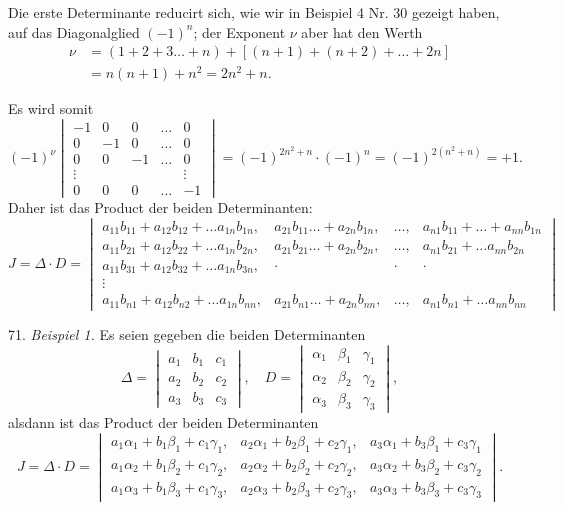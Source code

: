 \documentclass[11pt]{article}
\providecommand{\weberpage}[1]{}
\let\Delta\varDelta
\begin{document}
Die erste Determinante reducirt sich, wie wir in Beispiel 4 Nr. 30
gezeigt haben, auf das Diagonalglied $(-1)^n$; der Exponent $\nu$ aber
hat den Werth
\[
\begin{aligned}
\nu &= (1+2+3\dots+n)+[(n+1)+(n+2)+\dots+2n] \\
&= n(n+1)+n^2 = 2n^2+n.
\end{aligned}
\]


\weberpage{76}
Es wird somit
\[
(-1)^{\nu}
\begin{vmatrix}
-1 & 0 & 0 & \dots & 0 \\
0 & -1 & 0 & \dots & 0 \\
0 & 0 & -1 & \dots & 0 \\
\vdots & & & & \vdots \\
0 & 0 & 0 & \dots & -1
\end{vmatrix}
= (-1)^{2n^2+n} \cdot (-1)^n = (-1)^{2(n^2+n)} = +1.
\]
Daher ist das Product der beiden Determinanten:
\[
J = \Delta \cdot D =
\begin{vmatrix}
a_{11}b_{11}+a_{12}b_{12}+\dots a_{1n}b_{1n}, & a_{21}b_{11}\dots+a_{2n}b_{1n}, & \dots, & a_{n1}b_{11}+\dots+a_{nn}b_{1n} \\
a_{11}b_{21}+a_{12}b_{22}+\dots a_{1n}b_{2n}, & a_{21}b_{21}\dots+a_{2n}b_{2n}, & \dots, & a_{n1}b_{21}+\dots a_{nn}b_{2n} \\
a_{11}b_{31}+a_{12}b_{32}+\dots a_{1n}b_{3n}, & \cdot & \cdot & \cdot \\
\vdots & & & \\
a_{11}b_{n1}+a_{12}b_{n2}+\dots a_{1n}b_{nn}, & a_{21}b_{n1}\dots+a_{2n}b_{nn}, & \dots, & a_{n1}b_{n1}+\dots a_{nn}b_{nn}
\end{vmatrix}
\]

71. \textit{Beispiel 1.} Es seien gegeben die beiden Determinanten
\[
\Delta = \begin{vmatrix} a_1 & b_1 & c_1 \\ a_2 & b_2 & c_2 \\ a_3 & b_3 & c_3 \end{vmatrix}, \quad
D = \begin{vmatrix} \alpha_1 & \beta_1 & \gamma_1 \\ \alpha_2 & \beta_2 & \gamma_2 \\ \alpha_3 & \beta_3 & \gamma_3 \end{vmatrix},
\]
alsdann ist das Product der beiden Determinanten
\[
J = \Delta \cdot D =
\begin{vmatrix}
a_1\alpha_1+b_1\beta_1+c_1\gamma_1, & a_2\alpha_1+b_2\beta_1+c_2\gamma_1, & a_3\alpha_1+b_3\beta_1+c_3\gamma_1 \\
a_1\alpha_2+b_1\beta_2+c_1\gamma_2, & a_2\alpha_2+b_2\beta_2+c_2\gamma_2, & a_3\alpha_2+b_3\beta_2+c_3\gamma_2 \\
a_1\alpha_3+b_1\beta_3+c_1\gamma_3, & a_2\alpha_3+b_2\beta_3+c_2\gamma_3, & a_3\alpha_3+b_3\beta_3+c_3\gamma_3
\end{vmatrix}.
\]
\end{document}
